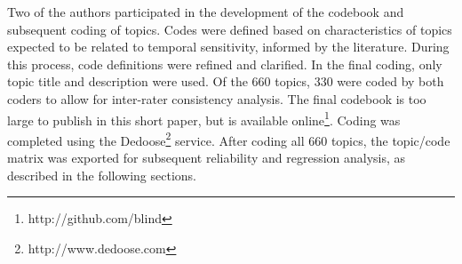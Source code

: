\documentclass{sig-alternate-05-2015}
\begin{document}
Two of the authors participated in the development of the codebook and subsequent coding of topics. Codes were defined based on characteristics of topics expected to be related to temporal sensitivity, informed by the literature. During this process, code definitions were refined and clarified. In the final coding, only topic title and description were used. Of the 660 topics, 330 were coded by both coders to allow for inter-rater consistency analysis.  The final codebook is too large to publish in this short paper, but is available online\footnote{http://github.com/blind}.  Coding was completed using the Dedoose\footnote{http://www.dedoose.com} service.  After coding all 660 topics, the topic/code matrix was exported for subsequent reliability and regression analysis, as described in the following sections. 

\end{document}
